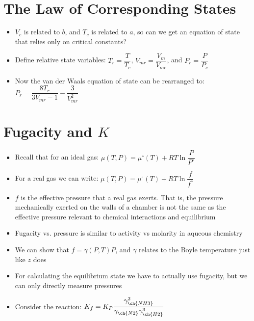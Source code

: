 \documentclass[12pt, openany, letterpaper]{memoir}
\begin{document}
\section*{The Law of Corresponding States}
\begin{itemize}
	\item $V_c$ is related to $b$, and $T_c$ is related to $a$, so can we get an equation of state that relies only on critical constants?
	\item Define relative state variables: $T_r=\dfrac{T}{T_c}$, $V_{mr}=\dfrac{V_m}{V_{mc}}$, and $P_r=\dfrac{P}{P_c}$
	\item Now the van der Waals equation of state can be rearranged to:$P_r=\dfrac{8T_r}{3V_{mr}-1}-\dfrac{3}{V_{mr}^2}$
\end{itemize}
\section*{Fugacity and $K$}
\begin{itemize}
	\item Recall that for an ideal gas: $\mu(T,P)=\mu^\circ(T)+RT\ln\dfrac{P}{P^\circ}$
	\item For a real gas we can write: $\mu(T,P)=\mu^\circ(T)+RT\ln\dfrac{f}{f^\circ}$
	\item $f$ is the effective pressure that a real gas exerts. That is, the pressure mechanically exerted on the walls of a chamber is not the same as the effective pressure relevant to chemical interactions and equilibrium
	\item Fugacity vs. pressure is similar to activity vs molarity in aqueous chemistry
	\item We can show that $f=\gamma(P,T) P$, and $\gamma$ relates to the Boyle temperature just like $z$ does
	\item For calculating the equilibrium state we have to actually use fugacity, but we can only directly measure pressures
	\item Consider the reaction:  \hspace{2em}$K_f=K_P\dfrac{\gamma_{\ch{NH3}}^2}{\gamma_{\ch{N2}}\gamma_{\ch{H2}}^3}$
\end{itemize}
\end{document}
